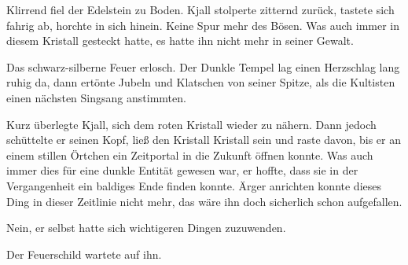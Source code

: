 Klirrend fiel der Edelstein zu Boden. Kjall stolperte zitternd zurück, tastete sich fahrig ab, horchte in sich hinein. Keine Spur mehr des Bösen. Was auch immer in diesem Kristall gesteckt hatte, es hatte ihn nicht mehr in seiner Gewalt.

Das schwarz-silberne Feuer erlosch. Der Dunkle Tempel lag einen Herzschlag lang ruhig da, dann ertönte Jubeln und Klatschen von seiner Spitze, als die Kultisten einen nächsten Singsang anstimmten.

Kurz überlegte Kjall, sich dem roten Kristall wieder zu nähern. Dann jedoch schüttelte er seinen Kopf, ließ den Kristall Kristall sein und raste davon, bis er an einem stillen Örtchen ein Zeitportal in die Zukunft öffnen konnte. Was auch immer dies für eine dunkle Entität gewesen war, er hoffte, dass sie in der Vergangenheit ein baldiges Ende finden konnte. Ärger anrichten konnte dieses Ding in dieser Zeitlinie nicht mehr, das wäre ihn doch sicherlich schon aufgefallen.

Nein, er selbst hatte sich wichtigeren Dingen zuzuwenden.

Der Feuerschild wartete auf ihn.
